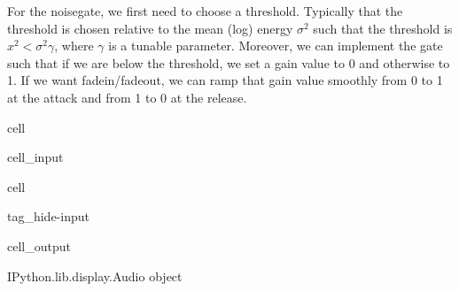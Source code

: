 \documentclass[letterpaper,10pt,english]{jupyterBook}
\begin{document}
\sphinxAtStartPar
For the noise\sphinxhyphen{}gate, we first need to choose a threshold. Typically that the threshold is chosen relative to the mean (log) energy \(\sigma^2\) such that the threshold is \(x^2 < \sigma^2\gamma\), where \(\gamma\) is a tunable parameter. Moreover, we can implement the gate such that if we are below the threshold, we set a gain value to 0 and otherwise to 1. If we want fade\sphinxhyphen{}in/fade\sphinxhyphen{}out, we can ramp that gain value smoothly from 0 to 1 at the attack and from 1 to 0 at the release.

\begin{sphinxuseclass}{cell}\begin{sphinxVerbatimInput}

\begin{sphinxuseclass}{cell_input}
\begin{sphinxVerbatim}[commandchars=\\\{\}]
  
  
   

     

    
\end{sphinxVerbatim}

\end{sphinxuseclass}\end{sphinxVerbatimInput}

\end{sphinxuseclass}
\begin{sphinxuseclass}{cell}
\begin{sphinxuseclass}{tag_hide-input}\begin{sphinxVerbatimOutput}

\begin{sphinxuseclass}{cell_output}
\noindent{}

\begin{sphinxVerbatim}[commandchars=\\\{\}]
\PYGZlt{}IPython.lib.display.Audio object\PYGZgt{}
\end{sphinxVerbatim}

\end{sphinxuseclass}\end{sphinxVerbatimOutput}

\end{sphinxuseclass}
\end{sphinxuseclass}
\end{document}
